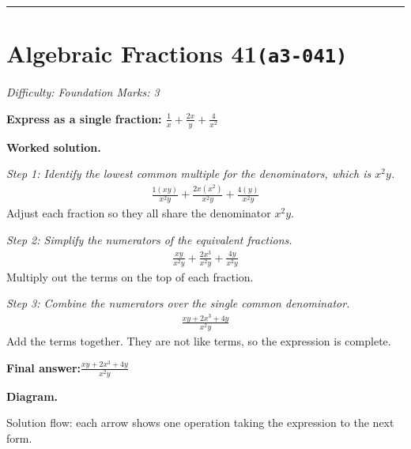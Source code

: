\documentclass[11pt]{article}
\newcommand{\question}[1]{\par\medskip\noindent\textbf{#1}\par}
\begin{document}
\medskip\hrule

\section*{Algebraic Fractions 41\quad\small\texttt{(a3-041)}}
\textit{Difficulty: Foundation \quad\textbar\quad Marks: 3}

\question{Express as a single fraction: \( \frac{1}{x} + \frac{2x}{y} + \frac{4}{x^2} \)}

\textbf{Worked solution.}

\textit{Step 1: Identify the lowest common multiple for the denominators, which is \( x^2y \).}
\[\begin{gathered}
\frac{1(xy)}{x^2y} + \frac{2x(x^2)}{x^2y} + \frac{4(y)}{x^2y}
\end{gathered}\]
Adjust each fraction so they all share the denominator \( x^2y \).

\textit{Step 2: Simplify the numerators of the equivalent fractions.}
\[\begin{gathered}
\frac{xy}{x^2y} + \frac{2x^3}{x^2y} + \frac{4y}{x^2y}
\end{gathered}\]
Multiply out the terms on the top of each fraction.

\textit{Step 3: Combine the numerators over the single common denominator.}
\[\begin{gathered}
\frac{xy + 2x^3 + 4y}{x^2y}
\end{gathered}\]
Add the terms together. They are not like terms, so the expression is complete.

\begin{answerbox}
\textbf{Final answer:}\quad \(\displaystyle \frac{xy + 2x^3 + 4y}{x^2y}\)
\end{answerbox}
\textbf{Diagram.}

\begin{center}
\end{center}
\small Solution flow: each arrow shows one operation taking the expression to the next form.\normalsize
\end{document}

